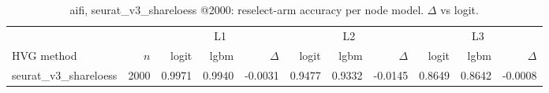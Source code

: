 \begin{table}[t]
\centering
\small
\begin{tabular}{lrrrrrrrrrr}
\toprule
 &  & \multicolumn{3}{c}{L1} & \multicolumn{3}{c}{L2} & \multicolumn{3}{c}{L3} \\
\cmidrule(lr){3-5}\cmidrule(lr){6-8}\cmidrule(lr){9-11}
HVG method & $n$ & logit & lgbm & $\Delta$ & logit & lgbm & $\Delta$ & logit & lgbm & $\Delta$ \\
\midrule
seurat\_v3\_shareloess & 2000 & 0.9971 & 0.9940 & -0.0031 & 0.9477 & 0.9332 & -0.0145 & 0.8649 & 0.8642 & -0.0008 \\
\bottomrule
\end{tabular}
\caption{aifi, seurat\_v3\_shareloess @2000: reselect-arm accuracy per node model. $\Delta$ vs logit.}
\label{tab:backend-aifi-seurat_v3_shareloess-2000}
\end{table}